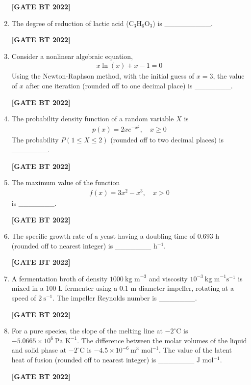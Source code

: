 \documentclass[12pt]{article}
\begin{document}
\begin{enumerate}[leftmargin=2.5em, label=\textbf{Q.\arabic*}., itemsep=2em, resume]
\noindent \textbf{[GATE BT 2022]}

\item The degree of reduction of lactic acid (C$_3$H$_6$O$_3$) is \_\_\_\_\_\_\_\_\_.

\noindent \textbf{[GATE BT 2022]}

\item Consider a nonlinear algebraic equation,
\begin{align*}
x \ln(x) + x - 1 = 0
\end{align*}
Using the Newton-Raphson method, with the initial guess of $x=3$, the value of $x$ after one iteration (rounded off to one decimal place) is \_\_\_\_\_\_\_.

\noindent \textbf{[GATE BT 2022]}

\item The probability density function of a random variable $X$ is
\begin{align*}
p(x) = 2x e^{-x^2}, \quad x \geq 0
\end{align*}
The probability $P(1 \leq X \leq 2)$ (rounded off to two decimal places) is \_\_\_\_\_\_\_.

\noindent \textbf{[GATE BT 2022]}

\item The maximum value of the function
\begin{align*}
f(x) = 3x^2 - x^3, \quad x>0
\end{align*}
is \_\_\_\_\_\_\_.

\noindent \textbf{[GATE BT 2022]}

\item The specific growth rate of a yeast having a doubling time of $0.693$ h (rounded off to nearest integer) is \_\_\_\_\_\_\_ h$^{-1}$.

\noindent \textbf{[GATE BT 2022]}

\item A fermentation broth of density $1000~\text{kg m}^{-3}$ and viscosity $10^{-3}~\text{kg m}^{-1}\text{s}^{-1}$ is mixed in a 100 L fermenter using a $0.1$ m diameter impeller, rotating at a speed of $2~\text{s}^{-1}$.  
The impeller Reynolds number is \_\_\_\_\_\_\_.

\noindent \textbf{[GATE BT 2022]}

\item For a pure species, the slope of the melting line at $-2^{\circ}$C is $-5.0665 \times 10^6~\text{Pa K}^{-1}$.  
The difference between the molar volumes of the liquid and solid phase at $-2^{\circ}$C is $-4.5\times 10^{-6}~\text{m}^3\text{ mol}^{-1}$.  
The value of the latent heat of fusion (rounded off to nearest integer) is \_\_\_\_\_\_\_ J mol$^{-1}$.

\noindent \textbf{[GATE BT 2022]}

\end{enumerate}
\end{document}
